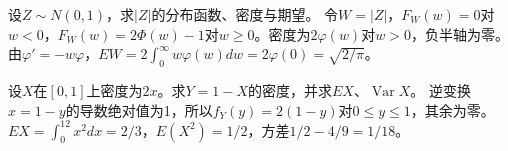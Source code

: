 设\(Z\sim N(0,1)\)，求\(|Z|\)的分布函数、密度与期望。
\solutionanswer
令\(W=|Z|\)，\(F_W(w)=0\)对\(w<0\)，\(F_W(w)=2\Phi(w)-1\)对\(w\ge0\)。密度为\(2\varphi(w)\)对\(w>0\)，负半轴为零。由\(\varphi'=-w\varphi\)，\(EW=2\int_0^\infty w\varphi(w)dw=2\varphi(0)=\sqrt{2/\pi}\)。


设\(X\)在\([0,1]\)上密度为\(2x\)。求\(Y=1-X\)的密度，并求\(EX\)、\(\operatorname{Var}X\)。
\solutionanswer
逆变换\(x=1-y\)的导数绝对值为1，所以\(f_Y(y)=2(1-y)\)对\(0\le y\le1\)，其余为零。\(EX=\int_0^12x^2dx=2/3\)，\(E(X^2)=1/2\)，方差\(1/2-4/9=1/18\)。
\par
